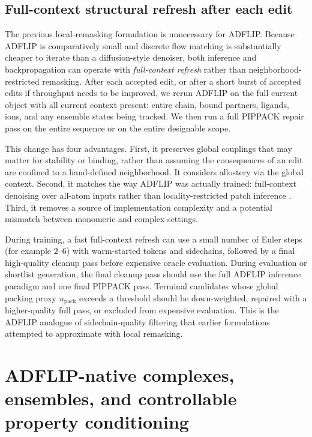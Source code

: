 \documentclass[11pt]{article}
\newcommand{\packunc}{\ensuremath{u_{\mathrm{pack}}}}
\begin{document}
	
	\subsection{Full-context structural refresh after each edit}
	
	The previous local-remasking formulation is unnecessary for ADFLIP. Because ADFLIP is comparatively small and discrete flow matching is substantially cheaper to iterate than a diffusion-style denoiser, both inference and backpropagation can operate with \emph{full-context refresh} rather than neighborhood-restricted remasking. After each accepted edit, or after a short burst of accepted edits if throughput needs to be improved, we rerun ADFLIP on the full current object with all current context present: entire chain, bound partners, ligands, ions, and any ensemble states being tracked. We then run a full PIPPACK repair pass on the entire sequence or on the entire designable scope.
	
	This change has four advantages. First, it preserves global couplings that may matter for stability or binding, rather than assuming the consequences of an edit are confined to a hand-defined neighborhood. It considers allostery via the global context. Second, it matches the way ADFLIP was actually trained: full-context denoising over all-atom inputs rather than locality-restricted patch inference \citep{yi2025adflip}. Third, it removes a source of implementation complexity and a potential mismatch between monomeric and complex settings.
	
	During training, a fast full-context refresh can use a small number of Euler steps (for example $2$--$6$) with warm-started tokens and sidechains, followed by a final high-quality cleanup pass before expensive oracle evaluation. During evaluation or shortlist generation, the final cleanup pass should use the full ADFLIP inference paradigm and one final PIPPACK pass. Terminal candidates whose global packing proxy \packunc{} exceeds a threshold should be down-weighted, repaired with a higher-quality full pass, or excluded from expensive evaluation. This is the ADFLIP analogue of sidechain-quality filtering that earlier formulations attempted to approximate with local remasking.
	
	
	\section{ADFLIP-native complexes, ensembles, and controllable property conditioning}
	\label{sec:complexaware}
	
\end{document}
